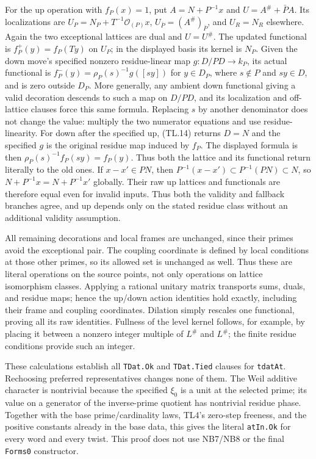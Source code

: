 \documentclass[11pt,a4paper]{article}
\numberwithin{equation}{section}
\theoremstyle{remark}\newtheorem{remark}[theorem]{Remark}
\begin{document}
For the up operation with $f_P(x)=1$, put
$A=N+P^{-1}x$ and $U=A^\#+\bar P A$. Its localizations are
$U_P=N_P+T^{-1}\mathcal O_{(P)}x$,
$U_{\bar P}=(A^\#)_{\bar P}$, and $U_R=N_R$ elsewhere.
Again the two exceptional lattices are dual and $U=U^\#$.
The updated functional is $f_P^+(y)=f_P(Ty)$ on $U_P$; in the
displayed basis its kernel is $N_P$. Given the down move's specified
nonzero residue-linear map $g:D/PD\to k_P$, its actual functional is
$f_P^-(y)=\rho_P(s)^{-1}g([sy])$ for $y\in D_P$, where
$s\notin P$ and $sy\in D$, and is zero outside $D_P$.
More generally, any ambient down functional giving a valid decoration
descends to such a map on $D/PD$, and its localization and off-lattice
clauses force this same formula.
Replacing $s$ by another denominator does not change the value:
multiply the two numerator equations and use residue-linearity.
For down after the specified up, (TL.14) returns $D=N$ and the
specified $g$ is the original residue map induced by $f_P$.
The displayed formula is then $\rho_P(s)^{-1}f_P(sy)=f_P(y)$.
Thus both the lattice and its functional return literally to the
old ones. If $x-x'\in PN$, then
$P^{-1}(x-x')\subset P^{-1}(PN)\subset N$, so
$N+P^{-1}x=N+P^{-1}x'$ globally. Their raw up lattices and
functionals are therefore equal even for invalid inputs. Thus both
the validity and fallback branches agree, and up depends only on
the stated residue class without an additional validity assumption.

All remaining decorations and local frames are unchanged, since
their primes avoid the exceptional pair. The coupling coordinate is
defined by local conditions at those other primes, so its allowed
set is unchanged as well. Thus these are literal operations on the
source points, not only operations on lattice isomorphism classes.
Applying a rational unitary matrix transports sums, duals, and
residue maps; hence the up/down action identities hold exactly,
including their frame and coupling coordinates. Dilation simply
rescales one functional, proving all its raw identities. Fullness
of the level kernel follows, for example, by placing it between a
nonzero integer multiple of $L^\#$ and $L^\#$; the finite residue
conditions provide such an integer.

These calculations establish all \texttt{TDat.Ok} and
\texttt{TDat.Tied} clauses for \texttt{tdatAt}. Rechoosing preferred
representatives changes none of them. The Weil additive character
is nontrivial because the specified $\xi_0$ is a unit at the selected
prime; its value on a generator of the inverse-prime quotient has
nontrivial residue phase. Together with the base prime/cardinality
laws, TL4's zero-step freeness, and the positive constants already
in the base data, this gives the literal \texttt{atIn.Ok} for every
word and every twist. This proof does not use NB7/NB8 or the final
\texttt{Forms0} constructor.
\end{document}
